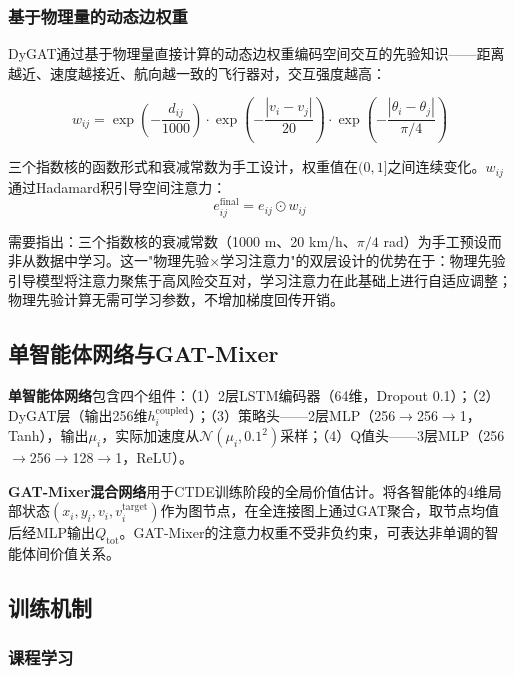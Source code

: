 \documentclass[12pt,a4paper,UTF8]{ctexart}
\begin{document}
\subsubsection{基于物理量的动态边权重}

DyGAT通过基于物理量直接计算的动态边权重编码空间交互的先验知识——距离越近、速度越接近、航向越一致的飞行器对，交互强度越高：

\begin{equation}
    w_{ij} = \exp\left(-\frac{d_{ij}}{1000}\right) \cdot \exp\left(-\frac{|v_i - v_j|}{20}\right) \cdot \exp\left(-\frac{|\theta_i - \theta_j|}{\pi/4}\right)
\end{equation}

三个指数核的函数形式和衰减常数为手工设计，权重值在$(0,1]$之间连续变化。$w_{ij}$通过Hadamard积引导空间注意力：
\begin{equation}
    e_{ij}^{\text{final}} = e_{ij} \odot w_{ij}
\end{equation}

需要指出：三个指数核的衰减常数（1000 m、20 km/h、$\pi/4$ rad）为手工预设而非从数据中学习。这一"物理先验$\times$学习注意力"的双层设计的优势在于：物理先验引导模型将注意力聚焦于高风险交互对，学习注意力在此基础上进行自适应调整；物理先验计算无需可学习参数，不增加梯度回传开销。

\subsection{单智能体网络与GAT-Mixer}

\textbf{单智能体网络}包含四个组件：（1）2层LSTM编码器（64维，Dropout 0.1）；（2）DyGAT层（输出256维$h_i^{\text{coupled}}$）；（3）策略头——2层MLP（256$\to$256$\to$1，Tanh），输出$\mu_i$，实际加速度从$\mathcal{N}(\mu_i, 0.1^2)$采样；（4）Q值头——3层MLP（256$\to$256$\to$128$\to$1，ReLU）。

\textbf{GAT-Mixer混合网络}用于CTDE训练阶段的全局价值估计。将各智能体的4维局部状态$(x_i, y_i, v_i, v_i^{\text{target}})$作为图节点，在全连接图上通过GAT聚合，取节点均值后经MLP输出$Q_{\text{tot}}$。GAT-Mixer的注意力权重不受非负约束，可表达非单调的智能体间价值关系。

\subsection{训练机制}

\subsubsection{课程学习}
\end{document}

